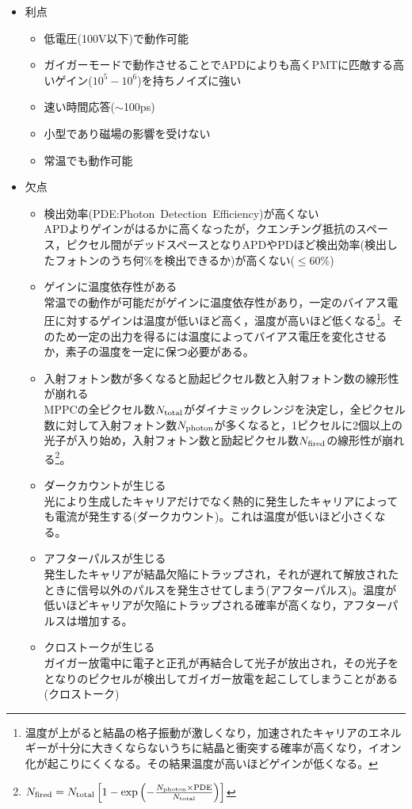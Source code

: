 \begin{itemize}
\item 利点

\begin{itemize}
\item 低電圧(100V以下)で動作可能
\item ガイガーモードで動作させることでAPDによりも高くPMTに匹敵する高いゲイン($10^5-10^6$)を持ちノイズに強い
\item 速い時間応答($\sim$100ps)
\item 小型であり磁場の影響を受けない
\item 常温でも動作可能
\end{itemize}

\item 欠点
\begin{itemize}
\item 検出効率(PDE:Photon\ Detection\ Efficiency)が高くない\\ APDよりゲインがはるかに高くなったが，クエンチング抵抗のスペース，ピクセル間がデッドスペースとなりAPDやPDほど検出効率(検出したフォトンのうち何$\%$を検出できるか)が高くない($\leq60\%$)
\item ゲインに温度依存性がある\\常温での動作が可能だがゲインに温度依存性があり，一定のバイアス電圧に対するゲインは温度が低いほど高く，温度が高いほど低くなる\footnote{温度が上がると結晶の格子振動が激しくなり，加速されたキャリアのエネルギーが十分に大きくならないうちに結晶と衝突する確率が高くなり，イオン化が起こりにくくなる。その結果温度が高いほどゲインが低くなる。}。そのため一定の出力を得るには温度によってバイアス電圧を変化させるか，素子の温度を一定に保つ必要がある。
\item 入射フォトン数が多くなると励起ピクセル数と入射フォトン数の線形性が崩れる\\MPPCの全ピクセル数$ N_{\rm total}$がダイナミックレンジを決定し，全ピクセル数に対して入射フォトン数$ N_{\rm photon}$が多くなると，1ピクセルに2個以上の光子が入り始め，入射フォトン数と励起ピクセル数$ N_{\rm fired}$の線形性が崩れる\footnote{$ N_{\rm fired}= N_{\rm total}\left[1-\exp{\left(-\frac{ N_{\rm photon}\times \rm PDE}{ N_{\rm total}}\right)}\right]$}。
\item ダークカウントが生じる\\光により生成したキャリアだけでなく熱的に発生したキャリアによっても電流が発生する(ダークカウント)。これは温度が低いほど小さくなる。
\item アフターパルスが生じる\\ 発生したキャリアが結晶欠陥にトラップされ，それが遅れて解放されたときに信号以外のパルスを発生させてしまう(アフターパルス)。温度が低いほどキャリアが欠陥にトラップされる確率が高くなり，アフターパルスは増加する。
\item クロストークが生じる\\
ガイガー放電中に電子と正孔が再結合して光子が放出され，その光子をとなりのピクセルが検出してガイガー放電を起こしてしまうことがある(クロストーク)

\end{itemize}

\end{itemize}


